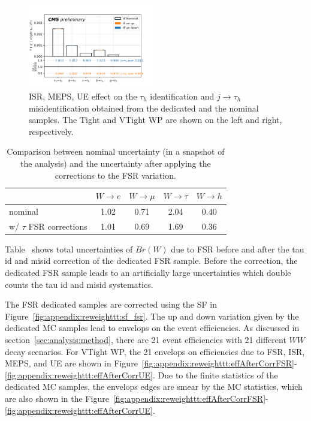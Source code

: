 \begin{figure}
    \includegraphics[width=0.49\textwidth]{chapters/Appendix/sectionTTSyst/figures/2020_MCRatio_ue_tauGenFlavor_tauVTight.png}
    \caption{ISR, MEPS, UE effect on the $\tau_h$ identification and $j \to \tau_h$ misidentification obtained from the dedicated and the nominal \ttbar samples.
    The Tight and VTight WP are shown on the left and right, respectively.
    }
    \label{fig:appendix:reweighttt:sf_isr_MEPS_UE}
\end{figure}




\begin{table}[h]
    \centering
    \caption{Comparison between nominal uncertainty (in a snapshot of
        the analysis) and the uncertainty after applying the corrections
        to the FSR variation.}
        
    \begin{tabular}{l|cccc}
                                  & $W\rightarrow e$ & $W\rightarrow \mu$ & $W\rightarrow \tau$ & $W\rightarrow h$ \\
        \hline
        nominal                   & 1.02             & 0.71               & 2.04                & 0.40             \\
        w/ $\tau$ FSR corrections & 1.01             & 0.69               & 1.69                & 0.36             \\
    \end{tabular}
    \label{fig:fsr_correction}
\end{table}


Table~\label{fig:fsr_correction} shows total uncertainties of $Br(W)$ due 
to FSR before and after the tau id and misid correction of the dedicated FSR sample.
Before the correction, the dedicated FSR sample leads to an artificially large
uncertainties which double counts the tau id and misid systematics.




The FSR dedicated \ttbar samples are corrected using the SF in Figure~\ref{fig:appendix:reweighttt:sf_fsr}.
The up and down variation given by the dedicated MC samples lead to envelops on the \ttbar event efficiencies.
As discussed in section~\ref{sec:analysis:method}, there are 21 \ttbar event efficiencies with 21 different
$WW$ decay scenarios. For VTight WP, the 21 envelops on efficiencies due to FSR, ISR, MEPS, and UE are shown in 
Figure~\ref{fig:appendix:reweighttt:effAfterCorrFSR}-\ref{fig:appendix:reweighttt:effAfterCorrUE}. 
Due to the finite statistics of the dedicated MC samples, the envelops edges are smear by the MC statistics, 
which are also shown in the Figure~\ref{fig:appendix:reweighttt:effAfterCorrFSR}-\ref{fig:appendix:reweighttt:effAfterCorrUE}.


